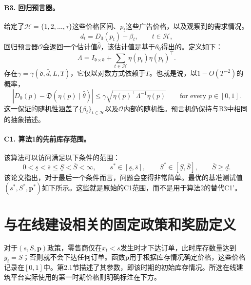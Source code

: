 \documentclass[11pt]{article}
\begin{document}
\paragraph{B3. 回归预言器。}
给定了\(\mathcal H=\{1,2,\ldots,\tau\}\)这些价格区间、\(p_t\)这些广告价格，以及观察到的需求情况。
\[
d_t=D_0(p_t)+\beta_t,\qquad t\in\mathcal H,
\]
回归预言器\(\mathcal O\)会返回一个估计值\(\widehat\theta\)，该估计值是基于\(\theta_0\)得出的。定义如下：
\[
\Lambda=I_{\mathfrak d\times\mathfrak d}
+\sum_{t\in\mathcal H}\eta(p_t)\eta(p_t)^\top.
\]
存在\(\gamma=\gamma(\mathfrak d,\bar d,L,T)\)，它仅以对数方式依赖于\(T\)。也就是说，以\(1-O(T^{-2})\)的概率，
\begin{equation}
\left|D_0(p)-\mathfrak D(\eta(p)\mid\widehat\theta)\right|
\leq\gamma\sqrt{\eta(p)^\top\Lambda^{-1}\eta(p)}
\qquad\text{for every }p\in[0,1].
\tag{8}
\end{equation}
这一保证的随机性涵盖了\(\{\beta_t\}_{t\in\mathcal H}\)以及\(\mathcal O\)内部的随机性。预言机仍保持与B3中相同的抽象描述。

\paragraph{C1. 算法1的先前库存范围。}
该算法可以访问满足以下条件的范围：
\[
0<\underline s<\bar s\leq\underline S<\bar S<\infty,
\qquad
s^*\in[\underline s,\bar s],\qquad
S^*\in[\underline S,\bar S],\qquad
\bar S\geq\underline d.
\]
该论文指出，对于最后一个条件而言，问题会变得非常简单。最优的基准测试值\((s^*,S^*,\boldsymbol p^*)\)如下所示。这些就是原始的C1范围，而不是用于算法2的替代C1'。

\section*{与在线建设相关的固定政策和奖励定义}
对于\((s,S,\boldsymbol p)\)政策，零售商仅在\(x_t<s\)发生时才下达订单，此时库存数量达到\(y_t=S\)；否则就不会下达任何订单。函数\(\boldsymbol p\)用于根据库存情况确定价格，这些价格记录在\([0,1]\)中。第2.1节描述了其参数，即该时期的初始库存情况。所选在线建筑平台实际使用的第一时期价格则明确标注在下方。
\end{document}

